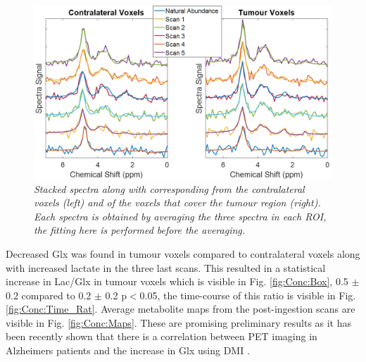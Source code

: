 \begin{figure}[H]
    \centering
    \includegraphics[width=1\linewidth]{Figures/Conclusion/Stacked.png}
    \caption{\textit{Stacked spectra along with corresponding from the contralateral voxels (left) and of the voxels that cover the tumour region (right). Each spectra is obtained by averaging the three spectra in each ROI, the fitting here is performed before the averaging.}}
    \label{fig:Conc:stack}
\end{figure}

Decreased Glx was found in tumour voxels compared to contralateral voxels along with increased lactate in the three last scans. This resulted in a statistical increase in Lac/Glx in tumour voxels which is visible in Fig. \ref{fig:Conc:Box}, 0.5 $\pm$ 0.2 compared to 0.2 $\pm$ 0.2 p$<$0.05, the time-course of this ratio is visible in Fig. \ref{fig:Conc:Time_Rat}. Average metabolite maps from the post-ingestion scans are visible in Fig. \ref{fig:Conc:Maps}. These are promising preliminary results as it has been recently shown that there is a correlation between PET imaging in Alzheimers patients and the increase in Glx using \ac{DMI} \cite{Bgh2024ComparisonDisease}.

